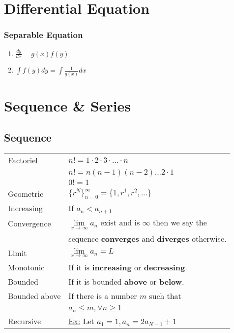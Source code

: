 \documentclass[5pt]{article}
\begin{document}
\begin{multicols}{2}
\begin{tabular}{ll}
\end{tabular}


\section{Differential Equation}
\subsubsection{Separable Equation}
\begin{enumerate}
    \item $\frac{dy}{dx}=g(x)f(y)$
    \item $\int f(y)dy=\int \frac{1}{g(x)}dx$
\end{enumerate}


\section{Sequence \& Series}
\subsection{Sequence}
\begin{tabular}{ll}
    Factoriel     & $n!=1\cdot2\cdot3\cdot ...\cdot n$\\
                  & $n!=n(n-1)(n-2)...2\cdot1$\\
                  & $0!=1$\\
    Geometric     & $\{r^N\}^\infty_{n=0}=\{1,r^1,r^2,...\}$\\
    Increasing    & If $a_n< a_{n+1}$\\
    Convergence   & \(\lim\limits_{x\to\infty} a_n\) exist and is $\infty$ then we say the\\
                  & sequence \textbf{converges} and \textbf{diverges} otherwise.\\
    Limit         & \(\lim\limits_{x\to\infty} a_n=L\)\\
    Monotonic     & If it is \textbf{increasing} or \textbf{decreasing}.\\
    Bounded       & If it  is bounded \textbf{above} or \textbf{below}.\\
    Bounded above & If there is a number $m$ such that\\
                  & $a_n\leq m, \forall n\geq1$\\
    Recursive  & \underline{Ex:} Let $a_1=1, a_n=2a_{N-1}+1$\\
\end{tabular}


\end{multicols}
\end{document}
